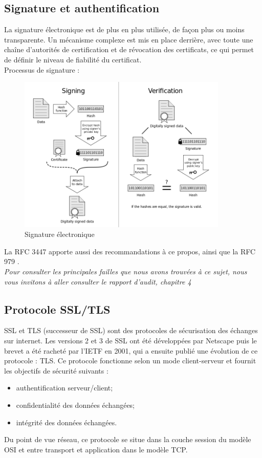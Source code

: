 \subsection{Signature et authentification}
La signature électronique est de plus en plus utilisée, de façon plus ou moins transparente. Un mécanisme complexe est mis en place derrière, avec toute une chaîne d'autorités de certification et de révocation des certificats, ce qui permet de définir le niveau de fiabilité du certificat. \\
Processus de signature : 
\begin{figure}[H]
\begin{center}
\includegraphics[width=10cm]{images/sig_dig.png}
\end{center}
\caption{Signature électronique}
\label{digital sig}
\end{figure}

La RFC 3447 \cite{rfc3447} \cite{rfc3447_trad} apporte aussi des recommandations à ce propos, ainsi que la RFC 979 \cite{rfc979}.\\

\textit{Pour consulter les principales failles que nous avons trouvées à ce sujet, nous vous invitons à aller consulter le rapport d'audit, chapitre 4} 

\subsection{Protocole SSL/TLS}
SSL et TLS (successeur de SSL) sont des protocoles de sécurisation des échanges sur internet. Les versions 2 et 3 de SSL ont été développées par Netscape puis le brevet a été racheté par l’IETF en 2001, qui a ensuite publié une évolution de ce protocole : TLS. Ce protocole fonctionne selon un mode client-serveur et fournit les objectifs de sécurité suivants :
\begin{itemize}
	\item authentification serveur/client;
	\item confidentialité des données échangées;
	\item intégrité des données échangées.\\
\end{itemize}
Du point de vue réseau, ce protocole se situe dans la couche session du modèle OSI et entre transport et application dans le modèle TCP.\\

